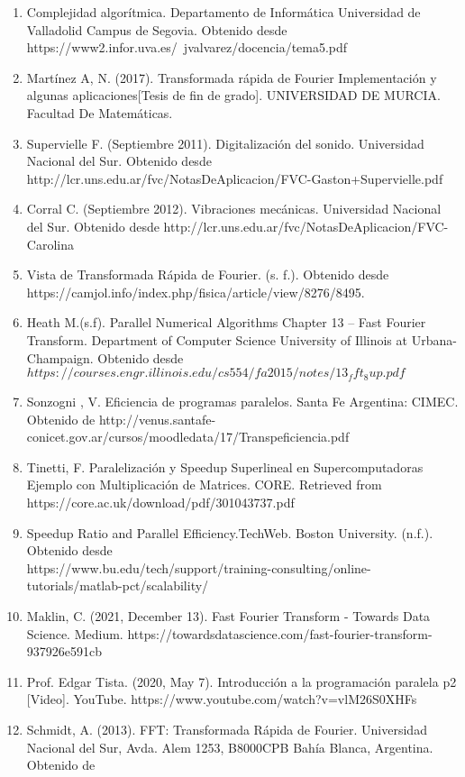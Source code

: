 \documentclass{article}
\begin{document}
\begin{enumerate}
    \item Complejidad algorítmica. Departamento de Informática Universidad de Valladolid Campus de Segovia. Obtenido desde https://www2.infor.uva.es/~jvalvarez/docencia/tema5.pdf
    \item Martínez A, N. (2017). Transformada rápida de Fourier
Implementación y algunas aplicaciones[Tesis de fin de grado]. UNIVERSIDAD DE MURCIA. Facultad De Matemáticas.
\item Supervielle F. (Septiembre 2011). Digitalización del sonido. Universidad Nacional del Sur. Obtenido desde http://lcr.uns.edu.ar/fvc/NotasDeAplicacion/FVC-Gaston+Supervielle.pdf
\item Corral C. (Septiembre 2012). Vibraciones mecánicas. Universidad Nacional del Sur. Obtenido desde http://lcr.uns.edu.ar/fvc/NotasDeAplicacion/FVC-Carolina%
\item Vista de Transformada Rápida de Fourier. (s. f.). Obtenido desde \\ https://camjol.info/index.php/fisica/article/view/8276/8495.
\item Heath M.(s.f). Parallel Numerical Algorithms Chapter 13 – Fast Fourier Transform. Department of Computer Science
University of Illinois at Urbana-Champaign. Obtenido desde $https://courses.engr.illinois.edu/cs554/fa2015/notes/13_fft_8up.pdf$
    \item Sonzogni , V. Eficiencia de programas paralelos. Santa Fe Argentina: CIMEC. Obtenido de http://venus.santafe-conicet.gov.ar/cursos/moodledata/17/Transpeficiencia.pdf
    \item Tinetti, F. Paralelización y Speedup Superlineal en Supercomputadoras Ejemplo con Multiplicación de Matrices. CORE. Retrieved from https://core.ac.uk/download/pdf/301043737.pdf
    \item Speedup Ratio and Parallel Efficiency.TechWeb. Boston University.
    (n.f.). Obtenido desde\\
    https://www.bu.edu/tech/support/training-consulting/online-tutorials/matlab-pct/scalability/
    \item Maklin, C. (2021, December 13). Fast Fourier Transform - Towards Data Science. Medium. https://towardsdatascience.com/fast-fourier-transform-937926e591cb
    \item Prof. Edgar Tista. (2020, May 7). Introducción a la programación paralela p2 [Video]. YouTube. https://www.youtube.com/watch?v=vlM26S0XHFs
    \item Schmidt, A. (2013). FFT: Transformada Rápida de Fourier. Universidad Nacional del Sur, Avda. Alem 1253, B8000CPB Bahía Blanca, Argentina. Obtenido de \\

\end{enumerate}
\end{document}

